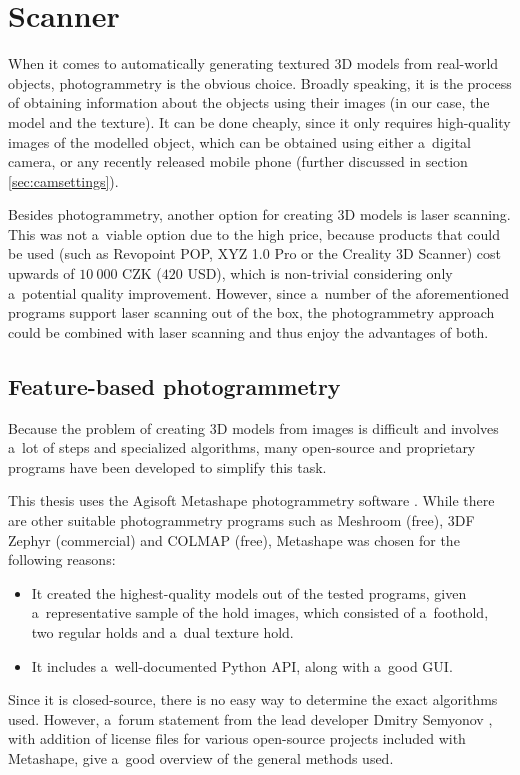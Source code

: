\chapter{Scanner}\label{sec:scanner}
When it comes to automatically generating textured 3D models from real-world objects, photogrammetry is the obvious choice.
Broadly speaking, it is the process of obtaining information about the objects using their images (in our case, the model and the texture).
It can be done cheaply, since it only requires high-quality images of the modelled object, which can be obtained using either a~digital camera, or any recently released mobile phone (further discussed in section \ref{sec:camsettings}).

Besides photogrammetry, another option for creating 3D models is laser scanning.
This was not a~viable option due to the high price, because products that could be used (such as Revopoint POP, XYZ 1.0 Pro or the Creality 3D Scanner) cost upwards of $10\ 000$ CZK ($420$ USD), which is non-trivial considering only a~potential quality improvement.
However, since a~number of the aforementioned programs support laser scanning out of the box, the photogrammetry approach could be combined with laser scanning and thus enjoy the advantages of both.

\section{Feature-based photogrammetry}
Because the problem of creating 3D models from images is difficult and involves a~lot of steps and specialized algorithms, many open-source and proprietary programs have been developed to simplify this task.

This thesis uses the Agisoft Metashape photogrammetry software \cite{metashape}.
While there are other suitable photogrammetry programs such as Meshroom (free), 3DF Zephyr (commercial) and COLMAP (free), Metashape was chosen for the following reasons:
\begin{itemize}
	\item It created the highest-quality models out of the tested programs, given a~representative sample of the hold images, which consisted of a~foothold, two regular holds and a~dual texture hold.
	\item It includes a~well-documented Python API, along with a~good GUI.
\end{itemize}

Since it is closed-source, there is no easy way to determine the exact algorithms used.
However, a~forum statement from the lead developer Dmitry Semyonov \parencite{metashapeForumPost}, with addition of license files for various open-source projects included with Metashape, give a~good overview of the general methods used.

